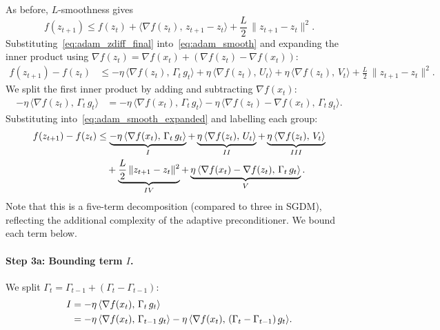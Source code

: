 \documentclass{article}
\begin{document}
As before, $L$-smoothness gives
\begin{equation}
f(z_{t+1}) \leq f(z_t) + \langle \nabla f(z_t),\, z_{t+1} - z_t \rangle
+ \frac{L}{2}\,\|z_{t+1} - z_t\|^2.
\label{eq:adam_smooth}
\end{equation}
Substituting~\eqref{eq:adam_zdiff_final} into~\eqref{eq:adam_smooth} and
expanding the inner product using
$\nabla f(z_t) = \nabla f(x_t) + (\nabla f(z_t) - \nabla f(x_t))$:
\begin{align}
f(z_{t+1}) - f(z_t)
&\leq -\eta\,\langle \nabla f(z_t),\, \Gamma_t\,g_t \rangle
   + \eta\,\langle \nabla f(z_t),\, U_t \rangle
   + \eta\,\langle \nabla f(z_t),\, V_t \rangle
   + \frac{L}{2}\,\|z_{t+1} - z_t\|^2.
\label{eq:adam_smooth_expanded}
\end{align}
We split the first inner product by adding and subtracting $\nabla f(x_t)$:
\begin{align}
-\eta\,\langle \nabla f(z_t),\, \Gamma_t\,g_t \rangle
&= -\eta\,\langle \nabla f(x_t),\, \Gamma_t\,g_t \rangle
   - \eta\,\langle \nabla f(z_t) - \nabla f(x_t),\, \Gamma_t\,g_t \rangle.
\label{eq:adam_split_I_V}
\end{align}
Substituting into~\eqref{eq:adam_smooth_expanded} and labelling each group:
\begin{align}
f(z_{t+1}) - f(z_t)
&\leq \underbrace{-\eta\,\langle \nabla f(x_t),\,
  \Gamma_t\,g_t \rangle}_{I}
  + \underbrace{\eta\,\langle \nabla f(z_t),\, U_t \rangle}_{II}
  + \underbrace{\eta\,\langle \nabla f(z_t),\, V_t \rangle}_{III}
  \notag \\
&\quad+ \underbrace{\frac{L}{2}\,\|z_{t+1} - z_t\|^2}_{IV}
  + \underbrace{\eta\,\langle \nabla f(x_t) - \nabla f(z_t),\,
  \Gamma_t\,g_t \rangle}_{V}.
\label{eq:adam_five_terms}
\end{align}
Note that this is a five-term decomposition (compared to three in SGDM),
reflecting the additional complexity of the adaptive preconditioner.
We bound each term below.

\paragraph{Step 3a: Bounding term $I$.}

We split $\Gamma_t = \Gamma_{t-1} + (\Gamma_t - \Gamma_{t-1})$:
\begin{align}
I &= -\eta\,\langle \nabla f(x_t),\, \Gamma_t\,g_t \rangle \notag \\
  &= -\eta\,\langle \nabla f(x_t),\, \Gamma_{t-1}\,g_t \rangle
     -\eta\,\langle \nabla f(x_t),\,
     (\Gamma_t - \Gamma_{t-1})\,g_t \rangle.
\label{eq:adam_I_split}
\end{align}
\end{document}
